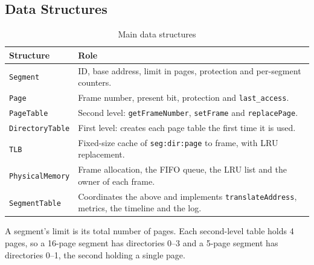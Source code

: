 \documentclass[11pt]{article}
\newcommand{\code}[1]{\texttt{#1}}
\begin{document}
\subsection{Data Structures}
\begin{table}[H]
\centering
\begin{tabularx}{\textwidth}{lX}
\toprule
\textbf{Structure} & \textbf{Role} \\
\midrule
\code{Segment} & ID, base address, limit in pages, protection and per-segment counters. \\
\code{Page} & Frame number, present bit, protection and \code{last\_access}. \\
\code{PageTable} & Second level: \code{getFrameNumber}, \code{setFrame} and \code{replacePage}. \\
\code{DirectoryTable} & First level: creates each page table the first time it is used. \\
\code{TLB} & Fixed-size cache of \code{seg:dir:page} to frame, with LRU replacement. \\
\code{PhysicalMemory} & Frame allocation, the FIFO queue, the LRU list and the owner of each frame. \\
\code{SegmentTable} & Coordinates the above and implements \code{translateAddress}, metrics, the timeline and the log. \\
\bottomrule
\end{tabularx}
\caption{Main data structures}
\end{table}

A segment's limit is its total number of pages. Each second-level table holds 4
pages, so a 16-page segment has directories 0--3 and a 5-page segment has
directories 0--1, the second holding a single page.
\end{document}
